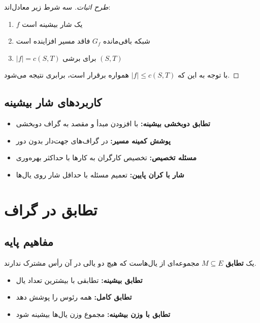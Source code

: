 \documentclass{matinbook}
\begin{document}
    \begin{proof}[طرح اثبات]
        سه شرط زیر معادل‌اند:
        \begin{enumerate}
            \item $f$ یک شار بیشینه است
            \item شبکه باقی‌مانده $G_{f}$ فاقد
            مسیر افزاینده است
            \item $|f| = c(S, T)$ برای برشی $(S, T)$
        \end{enumerate}
        با توجه به این که $|f| \leq c(S, T)$
        همواره برقرار است، برابری نتیجه می‌شود.
    \end{proof}
    
    \subsection{کاربردهای شار بیشینه}
    
    \begin{itemize}
        \item \textbf{تطابق دوبخشی بیشینه:}
        با افزودن مبدأ و مقصد به گراف دوبخشی
        \item \textbf{پوشش کمینه مسیر:}
        در گراف‌های جهت‌دار بدون دور
        \item \textbf{مسئله تخصیص:}
        تخصیص کارگران به کارها با حداکثر بهره‌وری
        \item \textbf{شار با کران پایین:}
        تعمیم مسئله با حداقل شار روی یال‌ها
    \end{itemize}
    
    \section{تطابق در گراف}
    
    \subsection{مفاهیم پایه}
    
    \begin{definition}[تطابق]
        یک \textbf{تطابق}
        $M \subseteq E$ مجموعه‌ای از یال‌هاست
        که هیچ دو یالی در آن رأس مشترک ندارند.
        \label{def:matching}
    \end{definition}
    
    \begin{definition}
        \begin{itemize}
            \item \textbf{تطابق بیشینه:}
            تطابقی با بیشترین تعداد یال
            \item \textbf{تطابق کامل:}
            همه رئوس را پوشش دهد
            \item \textbf{تطابق با وزن بیشینه:}
            مجموع وزن یال‌ها بیشینه شود
        \end{itemize}
        \label{def:matching-types}
    \end{definition}
    
\end{document}
